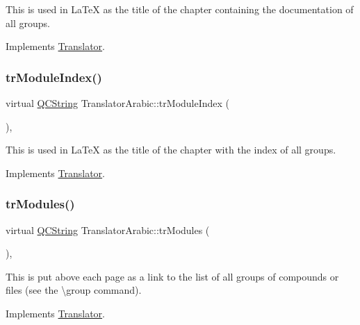 This is used in La\+TeX as the title of the chapter containing the documentation of all groups. 

Implements \mbox{\hyperlink{class_translator}{Translator}}.

\mbox{\label{class_translator_arabic_a763aedc374d5a545644b448871ddd6c1}} 
\subsubsection{\texorpdfstring{trModuleIndex()}{trModuleIndex()}}
{\footnotesize\ttfamily virtual \mbox{\hyperlink{class_q_c_string}{Q\+C\+String}} Translator\+Arabic\+::tr\+Module\+Index (\begin{DoxyParamCaption}{ }\end{DoxyParamCaption})\hspace{0.3cm}{\ttfamily [inline]}, {\ttfamily [virtual]}}

This is used in La\+TeX as the title of the chapter with the index of all groups. 

Implements \mbox{\hyperlink{class_translator}{Translator}}.

\mbox{\label{class_translator_arabic_a3b3d2c2a89ac09a21da233223676a26f}} 
\subsubsection{\texorpdfstring{trModules()}{trModules()}}
{\footnotesize\ttfamily virtual \mbox{\hyperlink{class_q_c_string}{Q\+C\+String}} Translator\+Arabic\+::tr\+Modules (\begin{DoxyParamCaption}{ }\end{DoxyParamCaption})\hspace{0.3cm}{\ttfamily [inline]}, {\ttfamily [virtual]}}

This is put above each page as a link to the list of all groups of compounds or files (see the \textbackslash{}group command). 

Implements \mbox{\hyperlink{class_translator}{Translator}}.

\mbox{\label{class_translator_arabic_aba7cd02c2d5f051596e1f64b9d6d7037}} 
